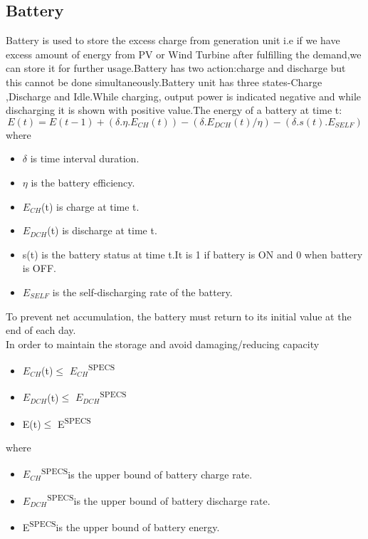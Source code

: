 \documentclass[runningheads]{llncs}
\begin{document}
\subsection{Battery}
Battery is used to store the excess charge from generation unit i.e  if we have excess amount of energy from PV or Wind Turbine after fulfilling the demand,we can store it  for further usage.Battery has two action:charge and discharge but this cannot be done simultaneously.Battery unit has three states-Charge ,Discharge and Idle.While charging, output power is indicated negative and while discharging it is shown with positive value.The energy of a battery at time t:\\
\[E(t)=E(t-1)+ (\delta.\eta.E_{CH}(t))-(\delta.E_{DCH}(t)/\eta)-(\delta.s(t).E_{SELF})\]
where
\begin{itemize}
\item $\delta$ is time interval duration.
\item $\eta$ is the battery efficiency.
\item $E_{CH}$(t) is charge at time t.
\item$E_{DCH}$(t) is discharge at time t.
\item s(t) is the battery status at time t.It is 1 if battery is ON and 0 when battery is OFF.
\item $E_{SELF}$ is the self-discharging rate of the battery.
\end{itemize}
To prevent net accumulation, the battery must return to its initial value at the end of each day.\\
In order to maintain the storage and avoid damaging/reducing capacity\\
\begin{itemize}
\item $E_{CH}$(t)$\leq$ $E_{CH}$\textsuperscript{SPECS}
\item $E_{DCH}$(t)$\leq$ $E_{DCH}$\textsuperscript{SPECS}
\item E(t)$\leq$ E\textsuperscript{SPECS}
\end{itemize}
where
\begin{itemize}
\item $E_{CH}$\textsuperscript{SPECS}is the upper bound of battery charge rate.
\item $E_{DCH}$\textsuperscript{SPECS}is the upper bound of battery discharge rate.
\item E\textsuperscript{SPECS}is the upper bound of battery energy.
\end{itemize}
\end{document}
